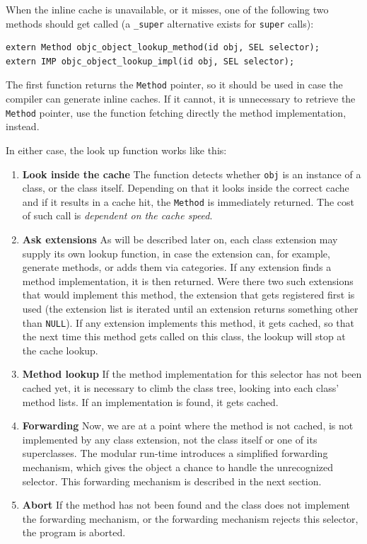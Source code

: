 When the inline cache is unavailable, or it misses, one of the following two methods should get called (a \verb=_super= alternative exists for \verb=super= calls):

\begin{verbatim}
extern Method objc_object_lookup_method(id obj, SEL selector);
extern IMP objc_object_lookup_impl(id obj, SEL selector);
\end{verbatim}

The first function returns the \verb=Method= pointer, so it should be used in case the compiler can generate inline caches. If it cannot, it is unnecessary to retrieve the \verb=Method= pointer, use the function fetching directly the method implementation, instead.

In either case, the look up function works like this:

\begin{enumerate}
  \item{\bf{Look inside the cache}} The function detects whether \verb=obj= is an instance of a class, or the class itself. Depending on that it looks inside the correct cache and if it results in a cache hit, the \verb=Method= is immediately returned. The cost of such call is \emph{dependent on the cache speed}.
  \item{\bf{Ask extensions}} As will be described later on, each class extension may supply its own lookup function, in case the extension can, for example, generate methods, or adds them via categories. If any extension finds a method implementation, it is then returned. Were there two such extensions that would implement this method, the extension that gets registered first is used (the extension list is iterated until an extension returns something other than \verb=NULL=). If any extension implements this method, it gets cached, so that the next time this method gets called on this class, the lookup will stop at the cache lookup.
  \item{\bf{Method lookup}} If the method implementation for this selector has not been cached yet, it is necessary to climb the class tree, looking into each class' method lists. If an implementation is found, it gets cached.
  \item{\bf{Forwarding}} Now, we are at a point where the method is not cached, is not implemented by any class extension, not the class itself or one of its superclasses. The modular run-time introduces a simplified forwarding mechanism, which gives the object a chance to handle the unrecognized selector. This forwarding mechanism is described in the next section.
  \item{\bf{Abort}} If the method has not been found and the class does not implement the forwarding mechanism, or the forwarding mechanism rejects this selector, the program is aborted.
\end{enumerate}

